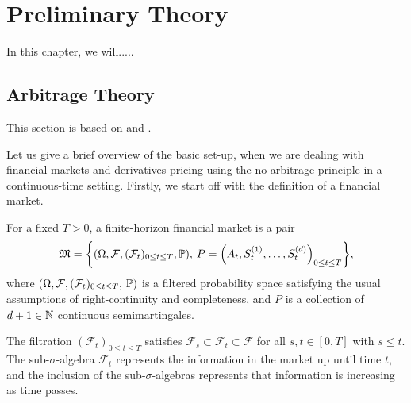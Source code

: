 \chapter{Preliminary Theory}
In this chapter, we will.....

\section{Arbitrage Theory}
This section is based on \cite{bjork} and \cite{Orimarsnoter}.

Let us give a brief overview of the basic set-up, when we are dealing with financial markets and derivatives pricing using the no-arbitrage principle in a continuous-time setting. Firstly, we start off with the definition of a financial market.
\begin{defn}
    For a fixed $T>0$, a finite-horizon financial market is a pair
    \begin{equation}\label{eq:market}
        \mathfrak{M}=\left\{\left(\Omega,\mathcal{F},(\mathcal{F}_{t})_{0\leq t\leq T},\mathbb{P}\right),\hspace{2 pt} P=\left(A_{t},S_{t}^{(1)},\dots,S_{t}^{(d)}\right)_{0\leq t\leq T}\right\},
    \end{equation}
    where $(\Omega,\mathcal{F},(\mathcal{F}_{t})_{0\leq t\leq T},\hspace{2 pt}\mathbb{P})$ is a filtered probability space satisfying the usual assumptions of right-continuity and completeness, and $P$ is a collection of $d+1\in\mathbb{N}$ continuous semimartingales.
\end{defn}
The filtration $(\mathcal{F}_{t})_{0\leq t\leq T}$ satisfies $\mathcal{F}_{s}\subset \mathcal{F}_{t}\subset \mathcal{F}$ for all $s,t\in [0,T]$ with $s\leq t$. The sub-$\sigma$-algebra $\mathcal{F}_{t}$ represents the information in the market up until time $t$, and the inclusion of the sub-$\sigma$-algebras represents that information is increasing as time passes.

